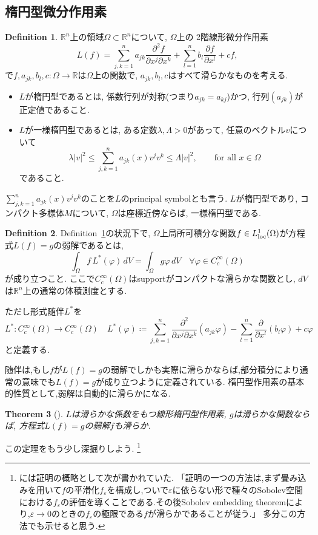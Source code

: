 \documentclass[dvipdfmx,a4paper,11pt]{article} %
\newtheorem{thm}{Theorem}[section]
\theoremstyle{definition}
\newtheorem{defn}[thm]{Definition}
\theoremstyle{remark}
\numberwithin{equation}{section}
\newcommand{\loc}{{\rm loc}}
\newcommand{\R}{\mathbb{R}}
\begin{document}
\subsection{楕円型微分作用素}

\begin{defn}
\label{defn-Sze-elliptic}
$\R^n$上の領域$\Omega\subset\mathbb{R}^n$について, $\Omega$上の
2階線形微分作用素
\[
L(f)=\sum_{j,k=1}^n a_{jk}\frac{\partial^2 f}{\partial x^j\partial x^k}
+\sum_{l=1}^n b_l\frac{\partial f}{\partial x^l}+cf,
\]
で$f,a_{jk},b_l,c\colon \Omega\to\mathbb{R}$は$\Omega$上の関数で,
$a_{jk},b_l,c$はすべて滑らかなものを考える. 
\begin{itemize}
\item $L$が楕円型であるとは, 係数行列が対称(つまり$a_{jk}=a_{kj}$)かつ, 行列$(a_{jk})$が正定値であること. 
\item $L$が一様楕円型であるとは, ある定数$\lambda,\Lambda>0$があって, 任意のベクトル$v$について
\[
\lambda\lvert v\rvert^2\leq \sum_{j,k=1}^n a_{jk}(x)v^jv^k \leq \Lambda\lvert v\rvert^2,\qquad \text{for all }x\in\Omega
\]
であること. 
\end{itemize}
\end{defn}
$\sum_{j,k=1}^n a_{jk}(x)v^jv^k $のことを$L$のprincipal symbolとも言う. 
$L$が楕円型であり, コンパクト多様体$M$について, $\Omega$は座標近傍ならば, 一様楕円型である. 

\begin{defn}
Definition~\ref{defn-Sze-elliptic}の状況下で, 
 $\Omega$上局所可積分な関数$f \in L^{1}_{\loc}(\Omega)$が方程式$L(f)=g$の弱解であるとは,
\[
\int_\Omega f\,L^*(\varphi)\,dV=\int_\Omega g\varphi\,dV
\quad \forall \varphi \in C^{\infty}_{c}(\Omega)
\]
が成り立つこと. 
ここで$C^{\infty}_{c}(\Omega)$はsupportがコンパクトな滑らかな関数とし, 
$dV$は$\mathbb{R}^n$上の通常の体積測度とする. 

ただし形式随伴$L^*$を
\[
L^* \colon C^{\infty}_{c}(\Omega) \to C^{\infty}_{c}(\Omega)
\quad
L^*(\varphi )\coloneqq \sum_{j,k=1}^n \frac{\partial^2}{\partial x^j\partial x^k}(a_{jk}\varphi )
-\sum_{l=1}^n \frac{\partial}{\partial x^l}(b_l \varphi )+c\varphi 
\]
と定義する. 
\end{defn}

随伴は,もし$f$が$L(f)=g$の弱解でしかも実際に滑らかならば,部分積分により通常の意味でも$L(f)=g$が成り立つように定義されている.
楕円型作用素の基本的性質として,弱解は自動的に滑らかになる.

\begin{thm}[{\cite[Theorem 2.5]{Sze14}}]
\label{thm-Sze-2.5}
$L$は滑らかな係数をもつ線形楕円型作用素, $g$は滑らかな関数ならば, 
方程式$L(f)=g$の弱解$f$も滑らか. 
\end{thm}
この定理をもう少し深掘りしよう. 
\footnote{\cite[Theorem 2.5]{Sze14}には証明の概略として次が書かれていた. 
「証明の一つの方法は,まず畳み込みを用いて$f$の平滑化$f_\varepsilon$を構成し,ついで$\varepsilon$に依らない形で種々のSobolev空間における$f_\varepsilon$の評価を導くことである.その後Sobolev embedding theoremにより,$\varepsilon\to 0$のときの$f_\varepsilon$の極限である$f$が滑らかであることが従う.」 多分この方法でも示せると思う.}
\end{document}
